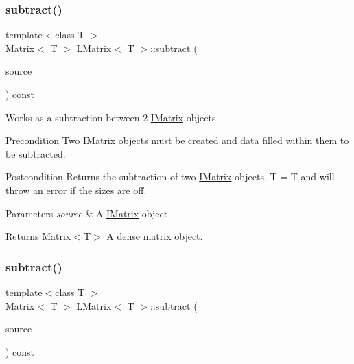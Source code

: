 \subsubsection{\texorpdfstring{subtract()}{subtract()}\hspace{0.1cm}{\footnotesize\ttfamily [4/6]}}
{\footnotesize\ttfamily template$<$class T $>$ \\
\mbox{\hyperlink{class_matrix}{Matrix}}$<$ T $>$ \mbox{\hyperlink{class_l_matrix}{L\+Matrix}}$<$ T $>$\+::subtract (\begin{DoxyParamCaption}\item[{const \mbox{\hyperlink{class_i_matrix}{I\+Matrix}}$<$ \mbox{\hyperlink{class_u_matrix}{U\+Matrix}}$<$ T $>$, T $>$ \&}]{source }\end{DoxyParamCaption}) const}



Works as a subtraction between 2 \mbox{\hyperlink{class_i_matrix}{I\+Matrix}} objects. 

\begin{DoxyPrecond}{Precondition}
Two \mbox{\hyperlink{class_i_matrix}{I\+Matrix}} objects must be created and data filled within them to be subtracted. 
\end{DoxyPrecond}
\begin{DoxyPostcond}{Postcondition}
Returns the subtraction of two \mbox{\hyperlink{class_i_matrix}{I\+Matrix}} objects. T = T and will throw an error if the sizes are off.
\end{DoxyPostcond}

\begin{DoxyParams}{Parameters}
{\em source} & A \mbox{\hyperlink{class_i_matrix}{I\+Matrix}} object \\
\hline
\end{DoxyParams}
\begin{DoxyReturn}{Returns}
Matrix$<$\+T$>$ A dense matrix object. 
\end{DoxyReturn}
\mbox{\label{class_l_matrix_a6adb72b127cc79a70a4b14f19b19d915}} 
\subsubsection{\texorpdfstring{subtract()}{subtract()}\hspace{0.1cm}{\footnotesize\ttfamily [5/6]}}
{\footnotesize\ttfamily template$<$class T $>$ \\
\mbox{\hyperlink{class_matrix}{Matrix}}$<$ T $>$ \mbox{\hyperlink{class_l_matrix}{L\+Matrix}}$<$ T $>$\+::subtract (\begin{DoxyParamCaption}\item[{const \mbox{\hyperlink{class_i_matrix}{I\+Matrix}}$<$ \mbox{\hyperlink{class_s_matrix}{S\+Matrix}}$<$ T $>$, T $>$ \&}]{source }\end{DoxyParamCaption}) const}



